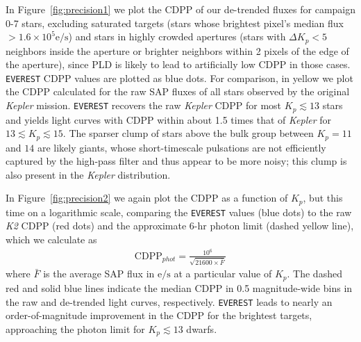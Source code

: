 \documentclass[]{emulateapj}
\begin{document}
In Figure~\ref{fig:precision1} we plot the CDPP of our de-trended fluxes for campaign 0-7 
stars, excluding saturated targets (stars whose brightest pixel's median flux $> 1.6\times 10^5 \mathrm{e/s}$) 
and stars in highly crowded apertures (stars with $\Delta K_p < 5$ neighbors
inside the aperture or brighter neighbors within 2 pixels of the edge of the aperture),
since PLD is likely to lead to artificially low CDPP in those cases. \texttt{EVEREST}
CDPP values are plotted as blue dots. For comparison, in yellow we plot the CDPP calculated for the raw
SAP fluxes of all stars observed by the original \emph{Kepler} mission. 
\texttt{EVEREST} recovers the raw \emph{Kepler} CDPP for most $K_p \lesssim 13$ stars
and yields light curves with CDPP within about 1.5 times that of \emph{Kepler}
for $13 \lesssim K_p \lesssim 15$. The sparser clump of stars above the bulk group between
$K_p = 11$ and $14$ are likely giants, whose short-timescale pulsations are not efficiently
captured by the high-pass filter and thus appear to be more noisy; this clump is also
present in the \emph{Kepler} distribution.

In Figure~\ref{fig:precision2} we again plot the CDPP as a function of $K_p$, but this time
on a logarithmic scale, comparing the \texttt{EVEREST} values (blue dots) to the raw \emph{K2}
CDPP (red dots) and the approximate 6-hr photon limit (dashed yellow line), which we calculate as
\begin{align}
\label{eq:phot}
\mathrm{CDPP}_{phot} = \frac{10^6}{\sqrt{21600\times\bar{F}}}
\end{align}
where $\bar{F}$ is the average SAP flux in $\mathrm{e/s}$ at a particular value of $K_p$. The dashed red
and solid blue lines indicate
the median CDPP in 0.5 magnitude-wide bins in the raw and de-trended light curves, respectively.
\texttt{EVEREST} leads to nearly an order-of-magnitude
improvement in the CDPP for the brightest targets, approaching the photon limit for 
$K_p \lesssim 13$ dwarfs.
\end{document}
